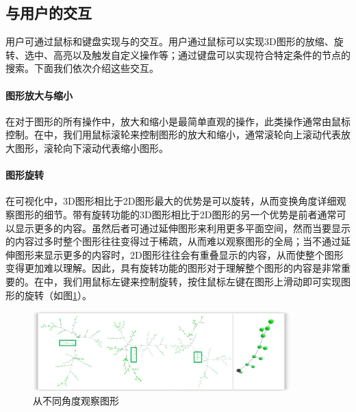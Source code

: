 
\subsection{与用户的交互}
用户可通过鼠标和键盘实现与的交互。用户通过鼠标可以实现3D图形的放缩、旋转、选中、高亮以及触发自定义操作等；通过键盘可以实现符合特定条件的节点的搜索。下面我们依次介绍这些交互。
\paragraph{图形放大与缩小}
在对于图形的所有操作中，放大和缩小是最简单直观的操作，此类操作通常由鼠标控制。在中，我们用鼠标滚轮来控制图形的放大和缩小，通常滚轮向上滚动代表放大图形，滚轮向下滚动代表缩小图形。
\paragraph{图形旋转}
在可视化中，3D图形相比于2D图形最大的优势是可以旋转，从而变换角度详细观察图形的细节。带有旋转功能的3D图形相比于2D图形的另一个优势是前者通常可以显示更多的内容。虽然后者可通过延伸图形来利用更多平面空间，然而当要显示的内容过多时整个图形往往变得过于稀疏，从而难以观察图形的全局；当不通过延伸图形来显示更多的内容时，2D图形往往会有重叠显示的内容，从而使整个图形变得更加难以理解。因此，具有旋转功能的图形对于理解整个图形的内容是非常重要的。在中，我们用鼠标左键来控制旋转，按住鼠标左键在图形上滑动即可实现图形的旋转（如图\ref{vmdv:prooftree:different:angle}）。

\begin{figure}[h!]
	\centering
	\includegraphics[width=10cm]{Img/phi_prooftreegraph_angles.png}
	\caption{从不同角度观察图形}
	\label{vmdv:prooftree:different:angle}
\end{figure}
